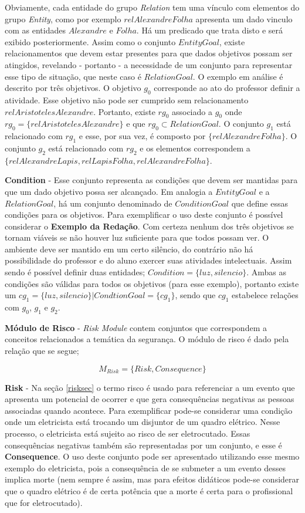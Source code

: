 Obviamente, cada entidade do grupo \textit{Relation} tem uma vínculo com elementos do grupo \textit{Entity}, como por exemplo $relAlexandreFolha$ apresenta um dado vinculo com as entidades $Alexandre$ e $Folha$. Há um predicado que trata disto e será exibido posteriormente. Assim como o conjunto $EntityGoal$, existe relacionamentos que devem estar presentes para que dados objetivos possam ser atingidos, revelando - portanto - a necessidade de um conjunto para representar esse tipo de situação, que neste caso é $RelationGoal$. O exemplo em análise é descrito por três objetivos. O objetivo $g_0$ corresponde ao ato  do professor definir a atividade. Esse objetivo não pode ser cumprido sem relacionamento $relAristotelesAlexandre$. Portanto, existe $rg_0$ associado a $g_0$ onde $rg_0 = \{ relAristotelesAlexandre \}$ e que $rg_0 \subset RelationGoal$. O conjunto $g_1$ está relacionado com $rg_1$ e esse, por sua vez, é composto por $\{ relAlexandreFolha\}$. O conjunto $g_2$ está relacionado com $rg_2$ e os elementos correspondem a $\{ relAlexandreLapis, relLapisFolha, relAlexandreFolha\}$.

\textbf{Condition} - Esse conjunto representa as condições que devem ser mantidas para que um dado objetivo possa ser alcançado. Em analogia a $EntityGoal$ e a $RelationGoal$, há um conjunto denominado de $ConditionGoal$ que define essas condições para os objetivos. Para exemplificar o uso deste conjunto é possível considerar o \textbf{Exemplo da Redação}. Com certeza nenhum dos três objetivos se tornam viáveis se não houver luz suficiente para que todos possam ver. O ambiente deve ser mantido em um certo silêncio, do contrário não há possibilidade do professor e do aluno exercer suas atividades intelectuais. Assim sendo é possível definir duas entidades; $Condition = \{ luz,silencio \}$. Ambas as condições são válidas para todos os objetivos (para esse
exemplo), portanto existe um $cg_1 = \{ luz,silencio \} | CondtionGoal = \{ cg_1 \}$, sendo que $cg_1$ estabelece relações com 
$g_0$, $g_1$ e $g_2$.

\textbf{Módulo de Risco} - \textit{Risk Module} contem conjuntos que correspondem a conceitos relacionados a temática da segurança.
O módulo de risco é dado pela relação que se segue;

\begin{equation}
    M_{Risk} = \{ Risk, Consequence \}
\end{equation}

\textbf{Risk} - Na seção \ref{risksec} o termo risco é usado para referenciar a um evento que apresenta um potencial de ocorrer e que gera consequências negativas as pessoas associadas quando acontece. Para exemplificar pode-se considerar uma condição onde um eletricista está trocando um disjuntor de um quadro elétrico. Nesse processo, o eletricista está sujeito ao risco de ser eletrocutado. Essas consequências negativas também são representadas por um conjunto, e esse é \textbf{Consequence}. O uso deste conjunto pode ser apresentado utilizando esse mesmo exemplo do eletricista, pois a consequência de se submeter a um evento desses implica morte (nem sempre é assim, mas para efeitos didáticos pode-se considerar que o quadro elétrico é de certa potência que a morte é certa para o profissional que for eletrocutado).